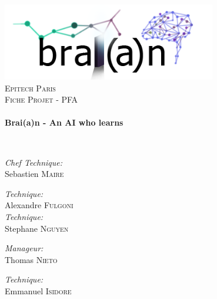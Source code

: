 \begin{titlepage}
  \begin{center}

    \includegraphics[width=0.7\textwidth]{braian}~\\[1cm]

    \textsc{\LARGE Epitech Paris}\\[1.5cm]

    \textsc{\Large Fiche Projet - PFA}\\[0.5cm]

    \HRule \\[0.4cm]
    { \huge \bfseries Brai(a)n - An AI who learns \\[0.4cm] }

    \HRule \\[1.5cm]

    \noindent

    \begin{multicols}{3}
      \emph{Chef Technique:}\\
      Sebastien \textsc{Maire} \\

      \vspace{1cm}

      \emph{Technique:} \\
      Alexandre \textsc{Fulgoni} \\

      \emph{Technique:} \\
      Stephane \textsc{Nguyen} \\

      \vspace{1cm}

      \emph{Manageur:} \\
      Thomas \textsc{Nieto} \\

      \vspace{1cm}

      \emph{Technique:} \\
      Emmanuel \textsc{Isidore} \\

      \vspace{1cm}


\end{multicols}
\end{center}
\end{titlepage}

